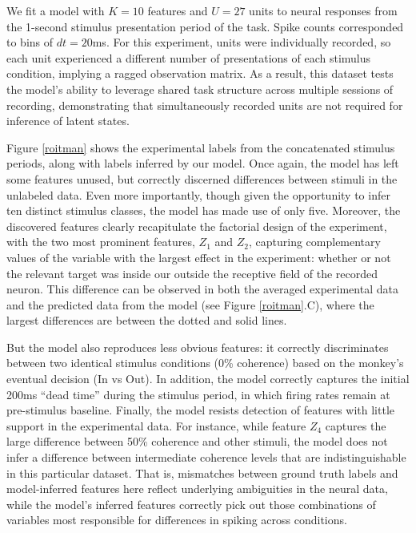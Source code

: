 \documentclass[10pt,letterpaper]{article}
\begin{document}
We fit a model with $K = 10$ features and $U = 27$ units to neural responses from the 1-second stimulus presentation period of the task. Spike counts corresponded to bins of $dt = 20$ms. For this experiment, units were individually recorded, so each unit experienced a different number of presentations of each stimulus condition, implying a ragged observation matrix. As a result, this dataset tests the model's ability to leverage shared task structure across multiple sessions of recording, demonstrating that simultaneously recorded units are not required for inference of latent states.

Figure \ref{roitman} shows the experimental labels from the concatenated stimulus periods, along with labels inferred by our model. Once again, the model has left some features unused, but correctly discerned differences between stimuli in the unlabeled data. Even more importantly, though given the opportunity to infer ten distinct stimulus classes, the model has made use of only five. Moreover, the discovered features clearly recapitulate the factorial design of the experiment, with the two most prominent features, $Z_1$ and $Z_2$, capturing complementary values of the variable with the largest effect in the experiment: whether or not the relevant target was inside our outside the receptive field of the recorded neuron. This difference can be observed in both the averaged experimental data and the predicted data from the model (see Figure \ref{roitman}.C), where the largest differences are between the dotted and solid lines.

But the model also reproduces less obvious features: it correctly discriminates between two identical stimulus conditions (0\% coherence) based on the monkey's eventual decision (In vs Out). In addition, the model correctly captures the initial 200ms ``dead time'' during the stimulus period, in which firing rates remain at pre-stimulus baseline. Finally, the model resists detection of features with little support in the experimental data. For instance, while feature $Z_4$ captures the large difference between 50\% coherence and other stimuli, the model does not infer a difference between intermediate coherence levels that are indistinguishable in this particular dataset. That is, mismatches between ground truth labels and model-inferred features here reflect underlying ambiguities in the neural data, while the model's inferred features correctly pick out those combinations of variables most responsible for differences in spiking across conditions.
\end{document}
